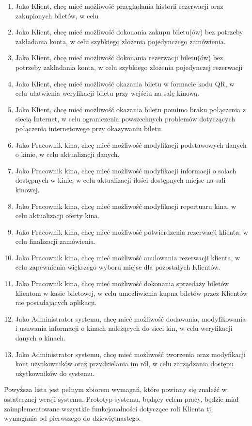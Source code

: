\begin{enumerate}
\item Jako Klient, chcę mieć możliwość przeglądania historii rezerwacji oraz zakupionych biletów, w celu   
\item Jako Klient, chcę mieć możliwość dokonania zakupu biletu(ów) bez potrzeby zakładania konta, w celu szybkiego złożenia pojedynczego zamówienia.
\item Jako Klient, chcę mieć możliwość dokonania rezerwacji biletu(ów) bez potrzeby zakładania konta, w celu szybkiego złożenia pojedynczej rezerwacji
\item Jako Klient, chcę mieć możliwość okazania biletu w formacie kodu QR, w celu ułatwienia weryfikacji biletu przy wejściu na salę kinową.
\item Jako Klient, chcę mieć możliwość okazania biletu pomimo braku połączenia z siecią Internet, w celu ograniczenia powszechnych problemów dotyczących połączenia internetowego przy okazywaniu biletu.\newline
\item Jako Pracownik kina, chcę mieć możliwość modyfikacji podstawowych danych o kinie, w celu aktualizacji danych.
\item Jako Pracownik kina, chcę mieć możliwość modyfikacji informacji o salach dostępnych w kinie, w celu aktualizacji ilości dostępnych miejsc na sali kinowej.
\item Jako Pracownik kina, chcę mieć możliwość modyfikacji repertuaru kina, w celu aktualizacji oferty kina.
\item Jako Pracownik kina, chcę mieć możliwość potwierdzenia rezerwacji klienta, w celu finalizacji zamówienia.
\item Jako Pracownik kina, chcę mieć możliwość anulowania rezerwacji klienta, w celu zapewnienia większego wyboru miejsc dla pozostałych Klientów.
\item Jako Pracownik kina, chcę mieć możliwość dokonania sprzedaży biletów klientom w kasie biletowej, w celu umożliwienia kupna biletów przez Klientów nie posiadających aplikacji.
\item Jako Administrator systemu, chcę mieć możliwość dodawania, modyfikowania i usuwania informacji o kinach należących do sieci kin, w celu weryfikacji danych o kinach.
\item Jako Administrator systemu, chcę mieć możliwość tworzenia oraz modyfikacji kont użytkowników oraz przydzielania im ról, w celu zarządzania dostępu użytkowników do systemu.
\end{enumerate}
Powyższa lista jest pełnym zbiorem wymagań, które powinny się znaleźć w ostatecznej wersji systemu. Prototyp systemu, będący celem pracy, będzie miał zaimplementowane wszystkie funkcjonalności dotyczące roli Klienta tj. wymagania od pierwszego do dziewiętnastego.
